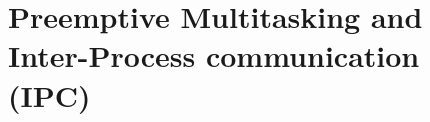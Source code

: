 \documentclass{article}
\begin{document}
\begin{CJK*}{UTF8}{gkai}
\begin{lstlisting}[style=console]
\end{lstlisting}



\begin{lstlisting}[style=exercise]
\end{lstlisting}


\begin{lstlisting}[style=exercise]
\end{lstlisting}

\begin{lstlisting}[style=exercise]
\end{lstlisting}


\begin{lstlisting}[style=exercise]
\end{lstlisting}

\begin{lstlisting}[style=acode, title={\scriptsize \ttfamily \bfseries kern/trapentry.S}]
\end{lstlisting}

\begin{lstlisting}[style=acode, title={\scriptsize \ttfamily \bfseries kern/trapentry.S}]
\end{lstlisting}

\begin{lstlisting}[style=acode, title={\scriptsize \ttfamily \bfseries kern/trapentry.S}]
\end{lstlisting}









\section{Preemptive Multitasking and Inter-Process communication (IPC)}




\begin{lstlisting}[style=console]
\end{lstlisting}

\begin{lstlisting}[style=exercise]
\end{lstlisting}



\begin{lstlisting}[style=acode, title={\scriptsize \ttfamily \bfseries kern/trapentry.S}]
\end{lstlisting}


\clearpage

\end{CJK*}
\end{document}
